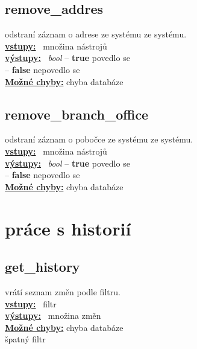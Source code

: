 \documentclass[a4paper, 11pt, twocolumn]{article}
\begin{document}
\pagebreak


\subsection{remove\_addres}
\vspace*{-0.3cm}
odstraní záznam o adrese ze systému ze systému. \\
\noindent \underline{\textbf{vstupy:}} \, množina nástrojů  \\
\noindent \underline{\textbf{výstupy:}} \, \textit{bool} -- \textbf{true} povedlo se \\
\hspace*{2.35cm} -- \textbf{false} nepovedlo se  \\
\underline{\textbf{Možné chyby:}} chyba databáze

\subsection{remove\_branch\_office}
\vspace*{-0.3cm}
odstraní záznam o pobočce ze systému ze systému. \\
\noindent \underline{\textbf{vstupy:}} \, množina nástrojů  \\
\noindent \underline{\textbf{výstupy:}} \, \textit{bool} -- \textbf{true} povedlo se \\
\hspace*{2.35cm} -- \textbf{false} nepovedlo se  \\
\underline{\textbf{Možné chyby:}} chyba databáze


\section{práce s historií}


\subsection{get\_history}
\vspace*{-0.3cm}
vrátí seznam změn podle filtru. \\
\noindent \underline{\textbf{vstupy:}} \, filtr  \\
\noindent \underline{\textbf{výstupy:}} \, množina změn\\
\underline{\textbf{Možné chyby:}} chyba databáze \\
\hspace*{1.4cm} špatný filtr\\
\end{document}
